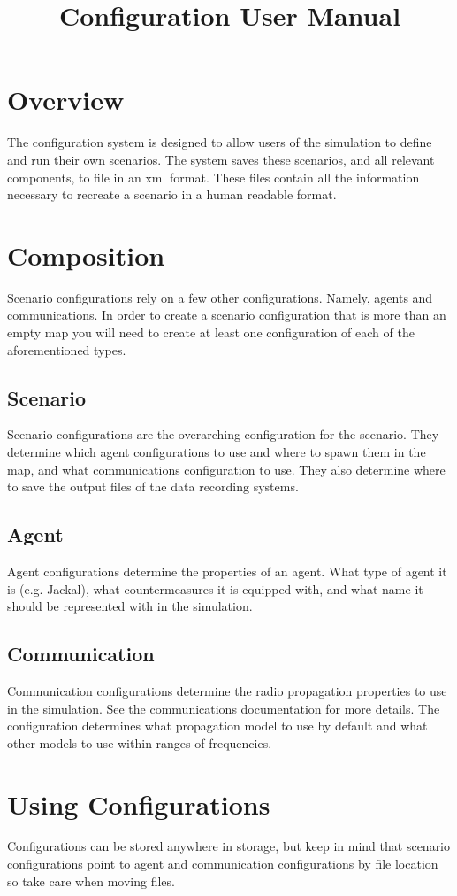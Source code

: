 \documentclass[../main.tex]{subfiles}
\title{Configuration User Manual}
\begin{document}
\section{Overview}
The configuration system is designed to allow users of the simulation to define and run their own scenarios.
The system saves these scenarios, and all relevant components, to file in an xml format.
These files contain all the information necessary to recreate a scenario in a human readable format.

\section{Composition}
Scenario configurations rely on a few other configurations.  Namely, agents and communications.
In order to create a scenario configuration that is more than an empty map you will need to create at least one configuration of each of the aforementioned types.

\subsection{Scenario}
Scenario configurations are the overarching configuration for the scenario.
They determine which agent configurations to use and where to spawn them in the map, and what communications configuration to use.
They also determine where to save the output files of the data recording systems.

\subsection{Agent}
Agent configurations determine the properties of an agent.
What type of agent it is (e.g. Jackal), what countermeasures it is equipped with, and what name it should be represented with in the simulation.


\subsection{Communication}
Communication configurations determine the radio propagation properties to use in the simulation.
See the communications documentation for more details.
The configuration determines what propagation model to use by default and what other models to use within ranges of frequencies.


\section{Using Configurations}
Configurations can be stored anywhere in storage, but keep in mind that scenario configurations point to agent and communication configurations by file location so take care when moving files.
\end{document}
